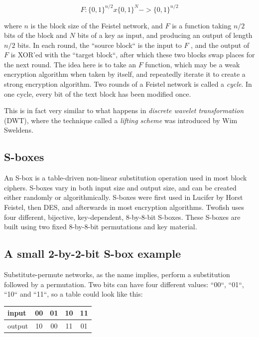 \begin{equation*}
  F : \lbrace 0, 1\rbrace^{n/2} x \lbrace0, 1\rbrace^N -> \lbrace 0, 1\rbrace^{n/2}
\end{equation*}

where $n$ is the block size of the Feistel network, and $F$ is a function taking $n/2$ bits of the block and $N$ bits of a key as input, and producing an output of length $n/2$ bits.
In each round, the ``source block`` is the input to $F$ , and the output of $F$ is XOR'ed with the ``target block``, after which these two blocks swap places for the next round.
The idea here is to take an $F$ function, which may be a weak encryption algorithm when taken by itself, and repeatedly iterate it to create a strong encryption algorithm.
Two rounds of a Feistel network is called a \emph{cycle}.
In one cycle, every bit of the text block has been modified once.

This is in fact very similar to what happens in \emph{discrete wavelet transformation} (DWT), where the technique called a \emph{lifting scheme} was introduced by Wim Sweldens.

\subsection{S-boxes}
An S-box is a table-driven non-linear substitution operation used in most block ciphers.
S-boxes vary in both input size and output size, and can be created either randomly or algorithmically.
S-boxes were first used in Lucifer by Horst Feistel, then DES, and afterwards in most encryption algorithms.
Twofish uses four different, bijective, key-dependent, $8$-by-$8$-bit S-boxes.
These S-boxes are built using two fixed $8$-by-$8$-bit permutations and key material.

\subsection{A small 2-by-2-bit S-box example}
Substitute-permute networks, as the name implies, perform a substitution followed by a permutation.
Two bits can have four different values: ``00``, ``01``, ``10`` and ``11``, so a table could look like this:
\begin{table}[htp]
  \begin{center}
    \label{fig:small_subs_example}
    \begin{tabular}{|l|c|c|c|c|}
      \hline
      input  & 00 & 01 & 10 & 11 \\ \hline
      output & 10 & 00 & 11 & 01 \\ \hline
    \end{tabular}
  \end{center}
\end{table}

